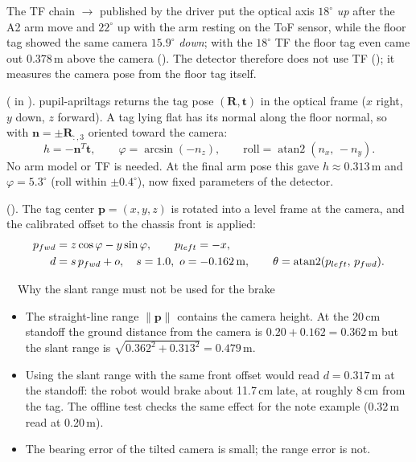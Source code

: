 The TF chain  $\rightarrow$
 published by the driver put the optical axis $18^\circ$ \emph{up} after the A2 arm move and
$22^\circ$ up with the arm resting on the ToF sensor, while the floor tag showed the same camera $15.9^\circ$
\emph{down}; with the $18^\circ$ TF the floor tag even came out 0.378\,m above the camera (). The detector therefore does not use TF
(); it measures the camera pose from the floor tag itself.

 ( in ).
pupil-apriltags returns the tag pose $(\mathbf R,\mathbf t)$ in the optical frame ($x$ right, $y$ down, $z$ forward).
A tag lying flat has its normal along the floor normal, so with $\mathbf n=\pm\mathbf R_{:,3}$ oriented toward the camera:
\begin{equation}
h=-\mathbf n^{T}\mathbf t,\qquad \varphi=\arcsin(-n_z),\qquad \text{roll}=\operatorname{atan2}(n_x,\,-n_y).
\end{equation}
No arm model or TF is needed. At the final arm pose this gave $h\approx0.313$\,m and $\varphi=5.3^\circ$ (roll within
$\pm0.4^\circ$), now fixed parameters of the detector.

 (). The tag center $\mathbf p=(x,y,z)$ is rotated into a level
frame at the camera, and the calibrated offset to the chassis front is applied:
\begin{equation}
\begin{aligned}
p_{fwd}&=z\cos\varphi-y\sin\varphi, \qquad p_{left}=-x,\\
d&=s\,p_{fwd}+o,\quad s=1.0,\ o=-0.162\text{\,m},\qquad \theta=\operatorname{atan2}(p_{left},\,p_{fwd}).
\end{aligned}
\end{equation}

\begin{bluebox}{\faRulerHorizontal\ \ Why the slant range must not be used for the brake}
\small
\begin{itemize}
  \item The straight-line range $\|\mathbf p\|$ contains the camera height. At the 20\,cm standoff the ground distance
        from the camera is $0.20+0.162=0.362$\,m but the slant range is $\sqrt{0.362^2+0.313^2}=0.479$\,m.
  \item Using the slant range with the same front offset would read $d=0.317$\,m at the standoff: the robot would
        brake about 11.7\,cm late, at roughly 8\,cm from the tag. The offline test
         checks the same effect for the note example (0.32\,m read at 0.20\,m).
  \item The bearing error of the tilted camera is small; the range error is not.
\end{itemize}
\end{bluebox}

